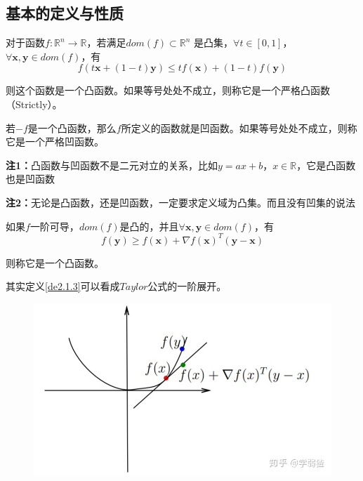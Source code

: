 \documentclass[lang=cn,10pt]{elegantbook}
\newcommand\bv[1]{\boldsymbol{#1}}
\newcommand\mb[1]{\mathbb{#1}}
\begin{document}
\subsection*{基本的定义与性质}
\begin{definition}
	对于函数${f}:\mathbb{R}^n \to \mathbb{R}$，若满足$dom( {f}) \subset \mb{R}^n$
	是凸集，$\forall t \in [0,1]$，$\forall \bv{x,y} \in dom( {f})$，有
	\begin{equation}
		f(t\bv{x}+(1-t)\bv{y})\leq tf(\bv{x})+(1-t)f(\bv{y})
	\end{equation}

	则这个函数是一个凸函数。如果等号处处不成立，则称它是一个严格凸函数（Strictly）。
\end{definition}
\begin{definition}
	若$-f$是一个凸函数，那么$f$所定义的函数就是凹函数。如果等号处处不成立，则称它是一个严格凹函数。
\end{definition}

\textbf{注1：}凸函数与凹函数不是二元对立的关系，比如$y=ax+b，x \in \mb{R}$，它是凸函数也是凹函数

\textbf{注2：}无论是凸函数，还是凹函数，一定要求定义域为凸集。而且没有凹集的说法

\begin{definition}
	\label{de2.1.3}
	如果$f$一阶可导，$dom(f)$是凸的，并且$\forall \bv{x,y} \in dom(f)$，有
	\begin{equation}\label{eq2.2}
		f(\bv{y}) \geq f(\bv{x}) + \nabla f(\bv{x})^T (\bv{y-x})
	\end{equation}

	则称它是一个凸函数。
\end{definition}

其实定义\ref{de2.1.3}可以看成$Taylor$公式的一阶展开。

\begin{figure}[h]
	\centering
	\includegraphics[scale = 0.5]{img/cf3.jpg}
	\caption{}
	\label{cf3}
\end{figure}
\end{document}

